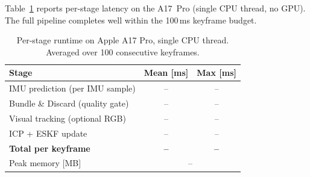 Table~\ref{tab:runtime} reports per-stage latency on the A17~Pro (single
CPU thread, no GPU).
The full pipeline completes well within the 100\,ms keyframe budget.

\begin{table}[t]
    \centering
    \caption{Per-stage runtime on Apple A17 Pro, single CPU thread.
    Averaged over 100 consecutive keyframes.}
    \label{tab:runtime}
    \setlength{\tabcolsep}{4pt}
    \footnotesize
    \begin{tabular}{lcc}
        \toprule
        Stage & Mean [ms] & Max [ms] \\
        \midrule
        IMU prediction (per IMU sample)         & -- & -- \\
        Bundle \& Discard (quality gate)        & -- & -- \\
        Visual tracking (optional RGB)          & -- & -- \\
        ICP + ESKF update                       & -- & -- \\
        \midrule
        \textbf{Total per keyframe}             & \textbf{--} & \textbf{--} \\
        Peak memory [MB]                        & \multicolumn{2}{c}{--} \\
        \bottomrule
    \end{tabular}
\end{table}
